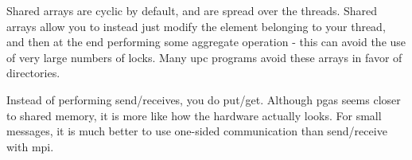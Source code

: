 \documentclass[10pt]{article}
\begin{document}
\begin{flushleft}
Shared arrays are cyclic by default, and are spread over the threads. Shared arrays allow you to instead just modify the element belonging to your thread, and then at the end performing some aggregate operation - this can avoid the use of very large numbers of locks. Many \gls{upc} programs avoid these arrays in favor of directories. 

Instead of performing send/receives, you do put/get. Although \gls{pgas} seems closer to shared memory, it is more like how the hardware actually looks. For small messages, it is much better to use one-sided communication than send/receive with \gls{mpi}.

\end{flushleft}
\end{document}

